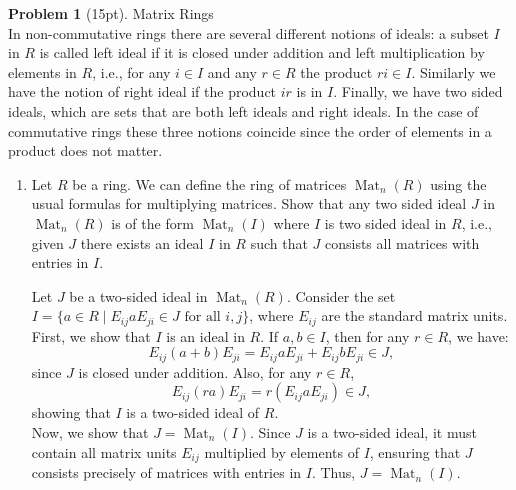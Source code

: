 \documentclass[12pt]{article}
\theoremstyle{definition}
\newtheorem{problem}{Problem}
\DeclareMathOperator{\Mat}{Mat}
\begin{document}
\begin{problem}[15pt] Matrix Rings\\
      In non-commutative rings there are several different notions of ideals: a subset $I$ in $R$
      is called left ideal if it is closed under addition and left multiplication by elements in $R$,
      i.e., for any $i \in I$ and any $r \in R$ the product $ri \in I$. Similarly we have the notion
      of right ideal if the product $ir$ is in $I$. Finally, we have two sided ideals, which are sets
      that are both left ideals and right ideals. In the case of commutative rings these three notions
      coincide since the order of elements in a product does not matter. 
      \begin{enumerate}[label=(\alph*)]
            \item Let $R$ be a ring. We can define the ring of matrices $\Mat_n(R)$ using the usual
                  formulas for multiplying matrices. Show that any two sided ideal $J$ in $\Mat_n(R)$
                  is of the form $\Mat_n(I)$ where $I$ is two sided ideal in $R$, i.e., given $J$
                  there exists an ideal $I$ in $R$ such that $J$ consists all matrices with entries
                  in $I$.

            \begin{solution}
                  Let $J$ be a two-sided ideal in $\Mat_n(R)$. Consider the set $I = \{ a \in R \mid E_{ij} a E_{ji} \in J \text{ for all } i,j \}$, where $E_{ij}$ are the standard matrix units. \\
                  
                  First, we show that $I$ is an ideal in $R$. If $a, b \in I$, then for any $r \in R$, we have:
                  \[
                        E_{ij} (a + b) E_{ji} = E_{ij} a E_{ji} + E_{ij} b E_{ji} \in J,
                  \]
                  since $J$ is closed under addition. Also, for any $r \in R$,
                  \[
                        E_{ij} (ra) E_{ji} = r (E_{ij} a E_{ji}) \in J,
                  \]
                  showing that $I$ is a two-sided ideal of $R$.\\
                  
                  Now, we show that $J = \Mat_n(I)$. Since $J$ is a two-sided ideal, it must contain all matrix units $E_{ij}$ multiplied by elements of $I$, ensuring that $J$ consists precisely of matrices with entries in $I$. Thus, $J = \Mat_n(I)$. \\
            \end{solution}


\end{enumerate}
\end{problem}
\end{document}
